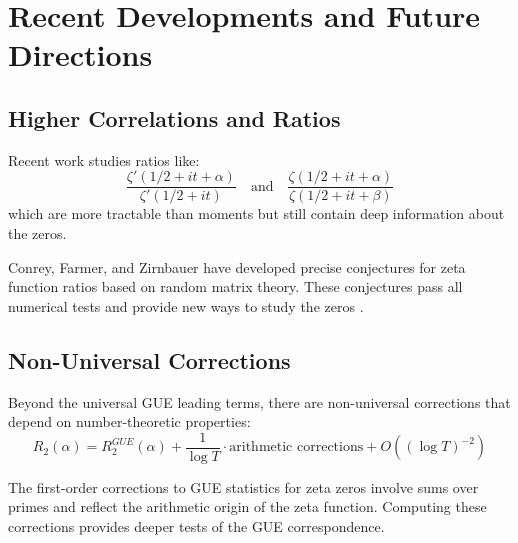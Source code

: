 \section{Recent Developments and Future Directions}
\label{sec:recent_developments}

\subsection{Higher Correlations and Ratios}

\begin{definition}
Recent work studies ratios like:
\begin{equation}
\frac{\zeta'(1/2 + it + \alpha)}{\zeta'(1/2 + it)} \quad \text{and} \quad \frac{\zeta(1/2 + it + \alpha)}{\zeta(1/2 + it + \beta)}
\end{equation}
which are more tractable than moments but still contain deep information about the zeros.
\end{definition}

\begin{theorem}
\label{thm:ratio_conjectures}
Conrey, Farmer, and Zirnbauer have developed precise conjectures for zeta function ratios based on random matrix theory. These conjectures pass all numerical tests and provide new ways to study the zeros \cite{conrey1989}.
\end{theorem}

\subsection{Non-Universal Corrections}

\begin{definition}
Beyond the universal GUE leading terms, there are non-universal corrections that depend on number-theoretic properties:
\begin{equation}
R_2(\alpha) = R_2^{GUE}(\alpha) + \frac{1}{\log T} \cdot \text{arithmetic corrections} + O((\log T)^{-2})
\end{equation}
\end{definition}

\begin{theorem}
\label{thm:arithmetic_corrections}
The first-order corrections to GUE statistics for zeta zeros involve sums over primes and reflect the arithmetic origin of the zeta function. Computing these corrections provides deeper tests of the GUE correspondence.
\end{theorem}

